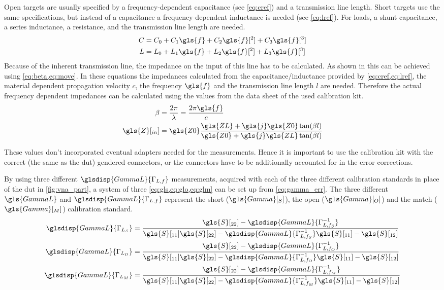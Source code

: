 \documentclass[12pt,a4paper,parskip=full,abstract=true,BCOR=12mm,twoside,open=right]{scrreprt}
\begin{document}
Open targets are usually specified by a frequency-dependent capacitance (see
\cref{eq:cref}) and a transmission line length. Short targets use the same
specifications, but instead of a capacitance a frequency-dependent inductance is
needed (see \cref{eq:lref}). For loads, a shunt capacitance, a series inductance,
a resistance, and the transmission line length are needed.
\begin{align}
    \label{eq:cref} C & = C_0 + C_1 \gls{f} + C_2 \gls{f}[^2] + C_3 \gls{f}[^3] \\
    \label{eq:lref} L & = L_0 + L_1 \gls{f} + L_2 \gls{f}[^2] + L_3 \gls{f}[^3]
\end{align}
Because of the inherent transmission line, the impedance on the input of this
line has to be calculated. As shown in \cite{pozar_mw_engineering_2011} this
can be achieved using \cref{eq:beta,eq:move}. In these equations the impedances
calculated from the capacitance/inductance provided by \cref{eq:cref,eq:lref},
the material dependent propagation velocity $c$, the frequency $\gls{f}$ and the transmission line
length $l$ are needed. Therefore the actual frequency dependent impedances can
be calculated using the values from the data sheet of the used calibration kit.
\begin{align}
    \label{eq:beta} \beta & = \frac{2 \pi}{\lambda} = \frac{2 \pi \gls{f}}{c}\\
    \label{eq:move} \gls{Z}[_{in}] & = \gls{Z0} \frac{\gls{ZL} + \gls{j} \gls{Z0} \tan(\beta l)}{\gls{Z0} + \gls{j} \gls{ZL} \tan(\beta l)}
\end{align}

These values don't incorporated eventual adapters needed for the measurements.
Hence it is important to use the calibration kit with the correct (the same as the \gls{dut}) gendered connectors, or
the connectors have to be additionally accounted for in the error corrections.

By using three different $\glsdisp{GammaL}{\Gamma_{L,f}}$ measurements, acquired with each of the three different calibration standards in place of the \gls{dut} in \cref{fig:vna_part},
a system of three \cref{eq:gls,eq:glo,eq:glm} can be set up from \cref{eq:gamma_err}. The
three different $\gls{GammaL}$ and $\glsdisp{GammaL}{\Gamma_{L,f}}$ represent the short ($\gls{Gamma}[_S]$),
the open ($\gls{Gamma}[_O]$) and the match ($\gls{Gamma}[_M]$) calibration standard.
\begin{align}
    \label{eq:gls} \glsdisp{GammaL}{\Gamma_{L_S}} & = \frac{\gls{S}[_{22}] - \glsdisp{GammaL}{\Gamma_{L,f_S}^{-1}}}{\gls{S}[_{11}] \gls{S}[_{22}] - \glsdisp{GammaL}{\Gamma_{L,f_S}^{-1}}\gls{S}[_{11}] - \gls{S}[_{12}]} \\
    \label{eq:glo} \glsdisp{GammaL}{\Gamma_{L_O}} & = \frac{\gls{S}[_{22}] - \glsdisp{GammaL}{\Gamma_{L,f_O}^{-1}}}{\gls{S}[_{11}] \gls{S}[_{22}] - \glsdisp{GammaL}{\Gamma_{L,f_O}^{-1}}\gls{S}[_{11}] - \gls{S}[_{12}]} \\
    \label{eq:glm} \glsdisp{GammaL}{\Gamma_{L_M}} & = \frac{\gls{S}[_{22}] - \glsdisp{GammaL}{\Gamma_{L,f_M}^{-1}}}{\gls{S}[_{11}] \gls{S}[_{22}] - \glsdisp{GammaL}{\Gamma_{L,f_M}^{-1}}\gls{S}[_{11}] - \gls{S}[_{12}]}
\end{align}
\end{document}

